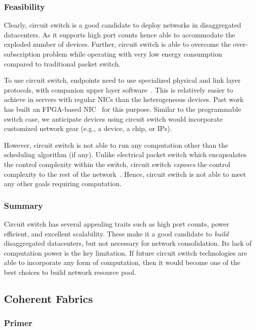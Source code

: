 \subsubsection{Feasibility}

Clearly, circuit switch is a good candidate to deploy networks in disaggregated datacenters.
As it supports high port counts hence able to accommodate the exploded number of devices.
Further, circuit switch is able to overcome the over-subscription problem while operating
with very low energy consumption compared to traditional packet switch.

To use circuit switch,
endpoints need to use specialized physical and link layer protocols,
with companion upper layer software~\cite{alex-thesis2020}.
This is relatively easier to achieve in servers with regular NICs
than the heterogeneous devices.
Past work has built an FPGA-based NIC~\cite{alex-thesis2020} for this purpose.
Similar to the programmable switch case,
we anticipate devices using circuit switch would incorporate customized network gear (e.g., a device, a chip, or IPs).

However, circuit switch is not able to
run any computation other than the scheduling algorithm (if any).
Unlike electrical packet switch which encapsulates the control complexity
within the switch, circuit switch \textit{exposes} the control complexity
to the rest of the network~\cite{rotornet-sigcomm17}.
Hence, circuit switch is not able to meet any other goals requiring computation.

\subsubsection{Summary}

Circuit switch has several appealing traits
such as high port counts, power efficient, and excellent scalability.
These make it a good candidate to \textit{build} disaggregated datacenters,
but not necessary for network consolidation.
Its lack of computation power is the key limitation.
If future circuit switch technologies are able to incorporate
any form of computation, then it would become one of the best choices
to build network resource pool.

\subsection{Coherent Fabrics}
\subsubsection{Primer}

